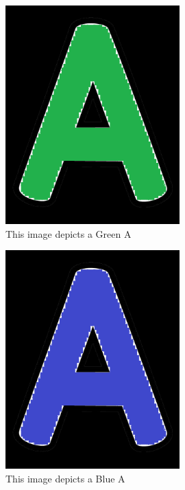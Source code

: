\documentclass[12pt, titlepage]{article}
\begin{document}
\begin{figure}[h!]
  \begin{center}
    \includegraphics[width=0.6\textwidth]{A_Green}
  \caption{This image depicts a Green A}
  \label{Fig_greenA} 
  \end{center}
  \end{figure}

\begin{figure}[h!]
  \begin{center}
    \includegraphics[width=0.6\textwidth]{A_Blue}
  \caption{This image depicts a Blue A}
  \label{Fig_blueA} 
  \end{center}
  \end{figure}
\end{document}
